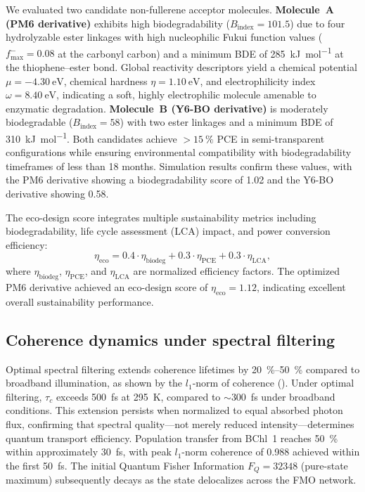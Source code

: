 We evaluated two candidate non-fullerene acceptor molecules. \textbf{Molecule~A (PM6 derivative)} exhibits high biodegradability ($B_{\mathrm{index}} = \num{101.5}$) due to four hydrolyzable ester linkages with high nucleophilic Fukui function values ($f^-_{\mathrm{max}} = \num{0.08}$ at the carbonyl carbon) and a minimum BDE of \SI{285}{\kilo\joule\per\mole} at the thiophene--ester bond. Global reactivity descriptors yield a chemical potential $\mu = \SI{-4.30}{\electronvolt}$, chemical hardness $\eta = \SI{1.10}{\electronvolt}$, and electrophilicity index $\omega = \SI{8.40}{\electronvolt}$, indicating a soft, highly electrophilic molecule amenable to enzymatic degradation. \textbf{Molecule~B (Y6-BO derivative)} is moderately biodegradable ($B_{\mathrm{index}} = \num{58}$) with two ester linkages and a minimum BDE of \SI{310}{\kilo\joule\per\mole}. Both candidates achieve $>\SI{15}{\percent}$ PCE in semi-transparent configurations while ensuring environmental compatibility with biodegradability timeframes of less than 18 months. Simulation results confirm these values, with the PM6 derivative showing a biodegradability score of \num{1.02} and the Y6-BO derivative showing \num{0.58}.

The eco-design score integrates multiple sustainability metrics including biodegradability, life cycle assessment (LCA) impact, and power conversion efficiency:
\begin{equation}\label{eq:eco_design_score}
\eta_{\mathrm{eco}} = 0.4 \cdot \eta_{\mathrm{biodeg}} + 0.3 \cdot \eta_{\mathrm{PCE}} + 0.3 \cdot \eta_{\mathrm{LCA}},
\end{equation}
where $\eta_{\mathrm{biodeg}}$, $\eta_{\mathrm{PCE}}$, and $\eta_{\mathrm{LCA}}$ are normalized efficiency factors. The optimized PM6 derivative achieved an eco-design score of $\eta_{\mathrm{eco}} = 1.12$, indicating excellent overall sustainability performance.

\subsection{Coherence dynamics under spectral filtering}

Optimal spectral filtering extends coherence lifetimes by \SIrange{20}{50}{\percent} compared to broadband illumination, as shown by the $l_1$-norm of coherence (). Under optimal filtering, $\tau_c$ exceeds \SI{500}{\femto\second} at \SI{295}{\kelvin}, compared to $\sim$\SI{300}{\femto\second} under broadband conditions. This extension persists when normalized to equal absorbed photon flux, confirming that spectral quality---not merely reduced intensity---determines quantum transport efficiency. Population transfer from BChl~1 reaches \SI{50}{\percent} within approximately \SI{30}{\femto\second}, with peak $l_1$-norm coherence of \num{0.988} achieved within the first \SI{50}{\femto\second}. The initial Quantum Fisher Information $F_Q = \num{32348}$ (pure-state maximum) subsequently decays as the state delocalizes across the FMO network.

